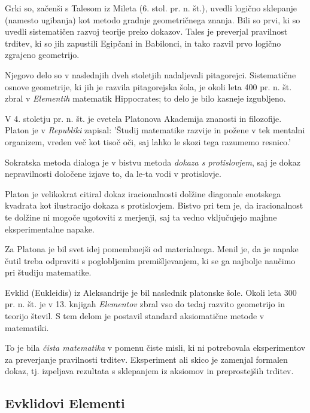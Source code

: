     Grki so, začenši s Talesom iz Mileta (6. stol. pr. n. št.), uvedli logično sklepanje (namesto ugibanja) kot metodo gradnje geometričnega znanja. Bili so prvi, ki so uvedli sistematičen razvoj teorije preko dokazov. Tales je preverjal pravilnost trditev, ki so jih zapustili Egipčani in Babilonci, in tako razvil prvo logično zgrajeno geometrijo.

    Njegovo delo so v naslednjih dveh stoletjih nadaljevali pitagorejci. Sistematične osnove geometrije, ki jih je razvila pitagorejska šola, je okoli leta 400 pr. n. št. zbral v \textit{Elementih} matematik Hippocrates; to delo je bilo kasneje izgubljeno.

    V 4. stoletju pr. n. št. je cvetela Platonova Akademija znanosti in filozofije. Platon je v \textit{Republiki} zapisal: 'Študij matematike razvije in požene v tek mentalni organizem, vreden več kot tisoč oči, saj lahko le skozi tega razumemo resnico.'

    Sokratska metoda dialoga je v bistvu metoda \textit{dokaza s protislovjem}, saj je dokaz nepravilnosti določene izjave to, da le-ta vodi v protislovje.

    Platon je velikokrat citiral dokaz iracionalnosti dolžine diagonale enotskega kvadrata kot ilustracijo dokaza s protislovjem. Bistvo pri tem je, da iracionalnost te dolžine ni mogoče ugotoviti z merjenji, saj ta  vedno vključujejo majhne eksperimentalne napake.

    Za Platona je bil svet idej pomembnejši od materialnega. Menil je, da je napake čutil treba odpraviti s poglobljenim premišljevanjem, ki se ga najbolje naučimo pri študiju matematike.

    Evklid (Eukleidis) iz Aleksandrije je bil naslednik platonske šole. Okoli leta 300 pr. n. št. je v 13. knjigah \textit{Elementov} zbral vso do tedaj razvito geometrijo in teorijo števil. S tem delom je postavil standard aksiomatične metode v matematiki.

    To je bila \textit{čista matematika} v pomenu čiste misli, ki ni potrebovala eksperimentov za preverjanje pravilnosti trditev. Eksperiment ali skico je zamenjal formalen dokaz, tj. izpeljava rezultata s sklepanjem iz aksiomov in preprostejših trditev.


\subsection*{Evklidovi Elementi}

